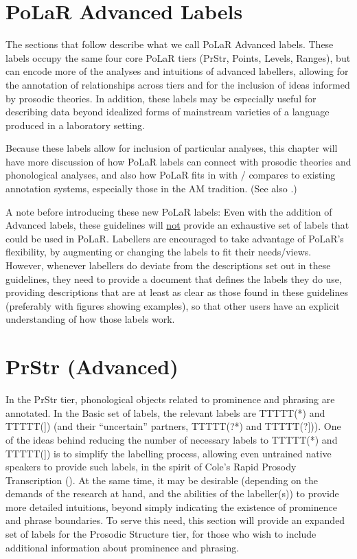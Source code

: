 \documentclass[11pt, twoside]{memoir}
\begin{document}
\section{PoLaR Advanced Labels}\label{sec:polar-advanced-labels}

The sections that follow describe what we call PoLaR Advanced labels. These labels occupy the same four core PoLaR tiers (PrStr, Points, Levels, Ranges), but can encode more of the analyses and intuitions of advanced labellers, allowing for the annotation of relationships across tiers and for the inclusion of ideas informed by prosodic theories. In addition, these labels may be especially useful for describing data beyond idealized forms of mainstream varieties of a language produced in a laboratory setting.

Because these labels allow for inclusion of particular analyses, this chapter will have more discussion of how PoLaR labels can connect with prosodic theories and phonological analyses, and also how PoLaR fits in with / compares to existing annotation systems, especially those in the AM tradition. (See also \citealt{ahn-19}.)

A note before introducing these new PoLaR labels: Even with the addition of Advanced labels, these guidelines will \uline{not} provide an exhaustive set of labels that could be used in PoLaR. Labellers are encouraged to take advantage of PoLaR’s flexibility, by augmenting or changing the labels to fit their needs\slash views. However, whenever labellers do deviate from the descriptions set out in these guidelines, they need to provide a document that defines the labels they do use, providing descriptions that are at least as clear as those found in these guidelines (preferably with figures showing examples), so that other users have an explicit understanding of how those labels work.

\section{PrStr (Advanced)}\label{sec:prstr-advanced}

In the PrStr tier, phonological objects related to prominence and phrasing are annotated. In the Basic set of labels, the relevant labels are TTTTT(*) and TTTTT(]) (and their “uncertain” partners, TTTTT(?*) and TTTTT(?])). One of the ideas behind reducing the number of necessary labels to TTTTT(*) and TTTTT(]) is to simplify the labelling process, allowing even untrained native speakers to provide such labels, in the spirit of Cole’s Rapid Prosody Transcription (\citealt{cole-14}). At the same time, it may be desirable (depending on the demands of the research at hand, and the abilities of the labeller(s)) to provide more detailed intuitions, beyond simply indicating the existence of prominence and phrase boundaries. To serve this need, this section will provide an expanded set of labels for the Prosodic Structure tier, for those who wish to include additional information about prominence and phrasing.
\end{document}
